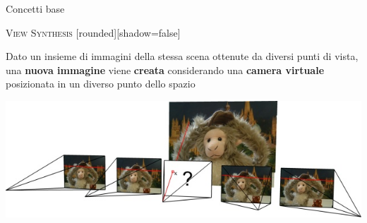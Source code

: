 \documentclass{beamer}
\begin{document}
\begin{section}{Concetti base}
\begin{frame}[t]{\textsc{View Synthesis}}
	[rounded][shadow=false]
\begin{block}{}
\center \small{ Dato un insieme di immagini della stessa scena ottenute da diversi punti di vista, una \textbf{nuova immagine} viene \textbf{creata} considerando una \textbf{camera virtuale} posizionata in un diverso punto dello spazio}
\end{block}
\vspace{2em}
\centering
\includegraphics[width=1\linewidth]{./img/nvs.jpg}
\end{frame}


\end{section}
\end{document}
